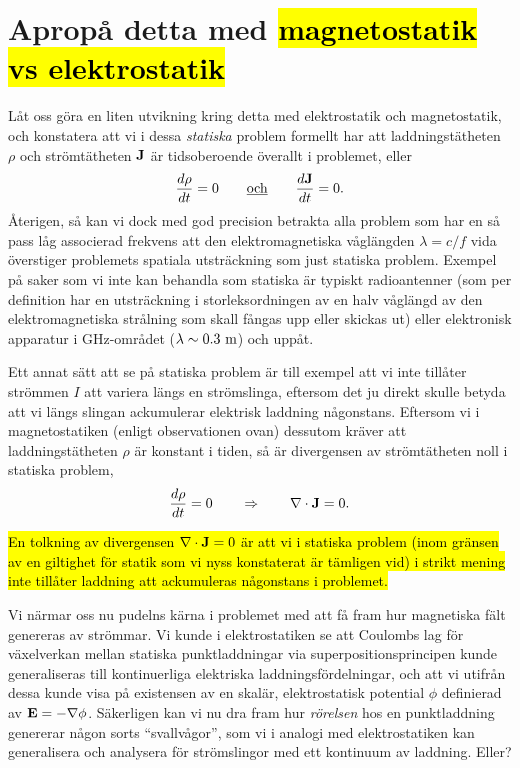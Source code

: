 {{\section{Aprop{\aa} detta med {\hl{magnetostatik vs elektrostatik}}}
L{\aa}t oss g{\"o}ra en liten utvikning kring detta med elektrostatik och
magnetostatik, och konstatera att vi i dessa {\it statiska} problem formellt
har att laddningst{\"a}theten $\rho$ och str{\"o}mt{\"a}theten ${\bf J}$
{\"a}r tidsoberoende {\"o}verallt i problemet, eller
\hl{$$
  {{d\rho}\over{dt}}=0
  \qquad\underline{\hbox{och}}\qquad
  {{d{\bf J}}\over{dt}}=0.
$$}
{\AA}terigen, s{\aa} kan vi dock med god precision betrakta alla problem som
har en s{\aa} pass l{\aa}g associerad frekvens att den elektromagnetiska
v{\aa}gl{\"a}ngden $\lambda=c/f$ vida {\"o}verstiger problemets spatiala
utstr{\"a}ckning
som just statiska problem. Exempel p{\aa} saker som vi inte kan behandla som
statiska {\"a}r typiskt radioantenner (som per definition har en
utstr{\"a}ckning i storleksordningen av en halv v{\aa}gl{\"a}ngd av den
elektromagnetiska str{\aa}lning som skall f{\aa}ngas upp eller skickas ut)
eller elektronisk apparatur i GHz-omr{\aa}det ($\lambda\sim0.3\ {\rm m}$)
och upp{\aa}t.

Ett annat s{\"a}tt att se p{\aa} statiska problem {\"a}r till exempel att vi
inte till{\aa}ter str{\"o}mmen $I$ att variera l{\"a}ngs en str{\"o}mslinga,
eftersom det ju direkt skulle betyda att vi l{\"a}ngs slingan ackumulerar
elektrisk laddning n{\aa}gonstans. Eftersom vi i magnetostatiken (enligt
observationen ovan) dessutom kr{\"a}ver att laddningst{\"a}theten $\rho$
{\"a}r konstant i tiden, s{\aa} {\"a}r divergensen av str{\"o}mt{\"a}theten
noll i statiska problem,
\hl{$$
  {{d\rho}\over{dt}}=0\qquad\Rightarrow\qquad\nabla\cdot{\bf J}=0.
$$}
{\hl{En tolkning av divergensen $\nabla\cdot{\bf J}=0$ {\"a}r att vi i statiska
problem (inom gr{\"a}nsen av en giltighet f{\"o}r statik som vi nyss
konstaterat {\"a}r t{\"a}mligen vid) i strikt mening inte till{\aa}ter
laddning att ackumuleras n{\aa}gonstans i problemet.}

Vi n{\"a}rmar oss nu pudelns k{\"a}rna i problemet med att f{\aa} fram hur
magnetiska f{\"a}lt genereras av str{\"o}mmar.
Vi kunde i elektrostatiken se att Coulombs lag f{\"o}r v{\"a}xelverkan mellan
statiska punktladdningar
via superpositionsprincipen kunde generaliseras till kontinuerliga elektriska
laddningsf{\"o}rdelningar, och att vi utifr{\aa}n dessa kunde visa p{\aa}
existensen av en skal{\"a}r, elektrostatisk potential $\phi$ definierad av
${\bf E}=-\nabla\phi$. S{\"a}kerligen kan vi nu dra fram hur {\it r{\"o}relsen}
hos en punktladdning genererar n{\aa}gon sorts ``svallv{\aa}gor'', som vi i
analogi med elektrostatiken kan generalisera och analysera f{\"o}r
str{\"o}mslingor med ett kontinuum av laddning. Eller?
\vfill\eject

}}}
